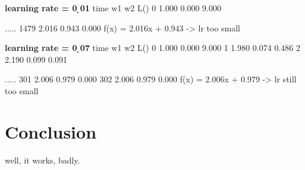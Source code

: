 \documentclass{article}
\begin{document}
\textbf{learning rate = 0 ̣01}
time    w1      w2      L()
0       1.000   0.000   9.000

.....
1479    2.016   0.943   0.000
f(x) = 2.016x + 0.943
-> lr too small

\textbf{learning rate = 0 ̣07}
time    w1      w2      L()
0       1.000   0.000   9.000
1       1.980   0.074   0.486
2       2.190   0.099   0.091

.....
301     2.006   0.979   0.000
302     2.006   0.979   0.000
f(x) = 2.006x + 0.979
-> lr still too small


\section{Conclusion}
well, it works, badly.
\end{document}
